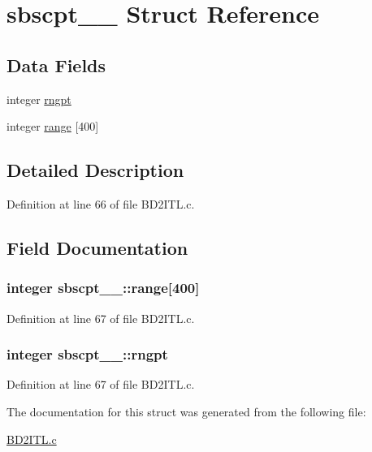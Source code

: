 \hypertarget{structsbscpt__1__}{}\section{sbscpt\+\_\+\_\+ Struct Reference}
\label{structsbscpt__1__}
\subsection*{Data Fields}
\begin{DoxyCompactItemize}
\item 
integer \hyperlink{structsbscpt__1___a1a5c159f641d361db1428e3b41943057}{rngpt}
\item 
integer \hyperlink{structsbscpt__1___ae46c75e832b41e8b99136809b231eb53}{range} \mbox{[}400\mbox{]}
\end{DoxyCompactItemize}


\subsection{Detailed Description}


Definition at line 66 of file B\+D2\+I\+T\+L.\+c.



\subsection{Field Documentation}
\subsubsection[{\texorpdfstring{range}{range}}]{\setlength{\rightskip}{0pt plus 5cm}integer sbscpt\+\_\+\_\+\+::range\mbox{[}400\mbox{]}}\hypertarget{structsbscpt__1___ae46c75e832b41e8b99136809b231eb53}{}\label{structsbscpt__1___ae46c75e832b41e8b99136809b231eb53}


Definition at line 67 of file B\+D2\+I\+T\+L.\+c.

\subsubsection[{\texorpdfstring{rngpt}{rngpt}}]{\setlength{\rightskip}{0pt plus 5cm}integer sbscpt\+\_\+\_\+\+::rngpt}\hypertarget{structsbscpt__1___a1a5c159f641d361db1428e3b41943057}{}\label{structsbscpt__1___a1a5c159f641d361db1428e3b41943057}


Definition at line 67 of file B\+D2\+I\+T\+L.\+c.



The documentation for this struct was generated from the following file\+:\begin{DoxyCompactItemize}
\item 
\hyperlink{BD2ITL_8c}{B\+D2\+I\+T\+L.\+c}\end{DoxyCompactItemize}
